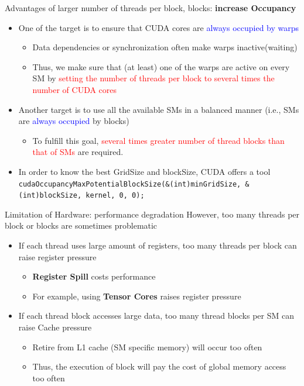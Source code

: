 \documentclass[dvipdfmx, 11pt, aspectratio=169]{beamer}   %
\begin{document}
\begin{frame}{Advantages of larger number of threads per block, blocks: \textbf{increase Occupancy}}
\begin{itemize}
  \item One of the target is to ensure that CUDA cores are \textcolor{blue}{always occupied by warps}
  \begin{itemize}
    \item Data dependencies or synchronization often make warps inactive(waiting)
    \item Thus, we make sure that (at least) one of the warps are active on every SM by \textcolor{red}{setting the number of threads per block to several times the number of CUDA cores}
  \end{itemize}
  \item Another target is to use all the available SMs in a balanced manner (i.e., SMs are \textcolor{blue}{always occupied} by blocks)
  \begin{itemize}
    \item To fulfill this goal, \textcolor{red}{several times greater number of thread blocks than that of SMs} are required.
  \end{itemize}
  \item In order to know the best GridSize and blockSize, CUDA offers a tool \lstinline|cudaOccupancyMaxPotentialBlockSize(&(int)minGridSize, &(int)blockSize, kernel, 0, 0);|
\end{itemize}
\end{frame}
\begin{frame}{Limitation of Hardware: performance degradation}
However, too many threads per block or blocks are sometimes problematic
\begin{itemize}
  \item If each thread uses large amount of registers, too many threads per block can raise register pressure
  \begin{itemize}
    \item \textbf{Register Spill} costs performance
    \item For example, using \textbf{Tensor Cores} raises register pressure
  \end{itemize}
  \item If each thread block accesses large data, too many thread blocks per SM can raise Cache pressure
  \begin{itemize}
    \item Retire from L1 cache (SM specific memory) will occur too often
    \item Thus, the execution of block will pay the cost of global memory access too often
  \end{itemize}
\end{itemize}
\end{frame}
\end{document}
